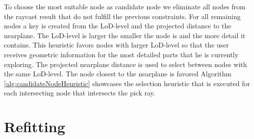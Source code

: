 To choose the most suitable node as candidate node we eliminate all nodes from the raycast result that do not fulfill the previous constraints. For all remaining nodes a key is created from the LoD-level and the projected distance to the nearplane. The LoD-level is larger the smaller the node is and the more detail it contains. This heuristic favors nodes with larger LoD-level so that the user receives geometric information for the most detailed parts that he is currently exploring. The projected nearplane distance is used to select between nodes with the same LoD-level. The node closest to the nearplane is favored Algorithm \ref{alg:candidateNodeHeuristic} showcases the selection heuristic that is executed for each intersecting node that intersects the pick ray. 




\section{Refitting}
\label{sec:Refitting}